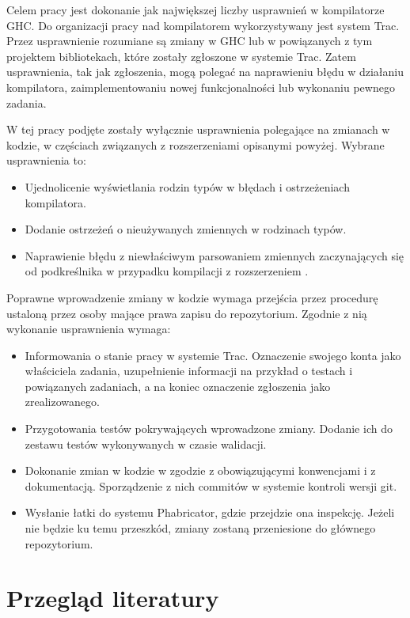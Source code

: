 Celem pracy jest dokonanie jak największej liczby usprawnień w kompilatorze
GHC. Do organizacji pracy nad kompilatorem wykorzystywany jest system
Trac. Przez usprawnienie rozumiane są zmiany w GHC lub w powiązanych z tym
projektem bibliotekach, które zostały zgłoszone w systemie Trac. Zatem
usprawnienia, tak jak zgłoszenia, mogą polegać na naprawieniu błędu w działaniu
kompilatora, zaimplementowaniu nowej funkcjonalności lub wykonaniu pewnego
zadania.

W tej pracy podjęte zostały wyłącznie usprawnienia polegające na zmianach w
kodzie, w częściach związanych z rozszerzeniami opisanymi powyżej. Wybrane
usprawnienia to:

\begin{itemize}
 \item Ujednolicenie wyświetlania rodzin typów w błędach i ostrzeżeniach kompilatora.
 \item Dodanie ostrzeżeń o nieużywanych zmiennych w rodzinach typów.
 \item Naprawienie błędu z niewłaściwym parsowaniem zmiennych zaczynających się od podkreślnika w przypadku kompilacji z rozszerzeniem .
\end{itemize}

Poprawne wprowadzenie zmiany w kodzie wymaga przejścia przez procedurę ustaloną
przez osoby mające prawa zapisu do repozytorium\cite{WikiFixingBugs}. Zgodnie z
nią wykonanie usprawnienia wymaga:

\begin{itemize}
  \item Informowania o stanie pracy w systemie Trac. Oznaczenie swojego konta jako właściciela zadania, uzupełnienie informacji na przykład o testach i powiązanych zadaniach, a na koniec oznaczenie zgłoszenia jako zrealizowanego.
  \item Przygotowania testów pokrywających wprowadzone zmiany. Dodanie ich do zestawu testów wykonywanych w czasie walidacji.
  \item Dokonanie zmian w kodzie w zgodzie z obowiązującymi konwencjami i z dokumentacją. Sporządzenie z nich commitów w systemie kontroli wersji git.
  \item Wysłanie łatki do systemu Phabricator, gdzie przejdzie ona inspekcję. Jeżeli nie będzie ku temu przeszkód, zmiany zostaną przeniesione do głównego repozytorium.
\end{itemize}

\section{Przegląd literatury}\label{sec:przeglad_literatury}

